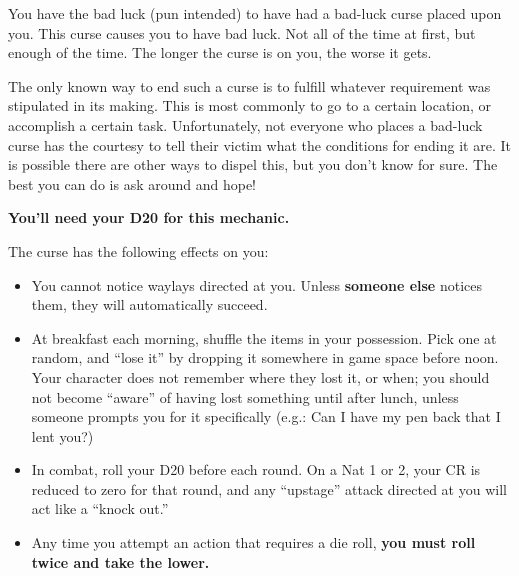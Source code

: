 \documentclass[green]{GL2020}
\begin{document}
\name{\gBadLuckCurse{}}

You have the bad luck (pun intended) to have had a bad-luck curse placed upon you. This curse causes you to have bad luck. Not all of the time at first, but enough of the time. The longer the curse is on you, the worse it gets.

The only known way to end such a curse is to fulfill whatever requirement was stipulated in its making. This is most commonly to go to a certain location, or accomplish a certain task. Unfortunately, not everyone who places a bad-luck curse has the courtesy to tell their victim what the conditions for ending it are. It is possible there are other ways to dispel this, but you don’t know for sure. The best you can do is ask around and hope!

\textbf{You’ll need your D20  for this mechanic.}

The curse has the following effects on you:
\begin{itemize}
  \item You cannot notice waylays directed at you. Unless \textbf{someone else} notices them, they will automatically succeed.
  \item At breakfast each morning, shuffle the items in your possession. Pick one at random, and ``lose it'' by dropping it somewhere in game space before noon. Your character does not remember where they lost it, or when; you should not become ``aware'' of having lost something until after lunch, unless someone prompts you for it specifically (e.g.: Can I have my pen back that I lent you?)
  \item In combat, roll your D20 before each round. On a Nat 1 or 2, your CR is reduced to zero for that round, and any ``upstage'' attack directed at you will act like a ``knock out.''
  \item Any time you attempt an action that requires a die roll, \textbf{you must roll twice and take the lower.}
\end{itemize}
\end{document}
